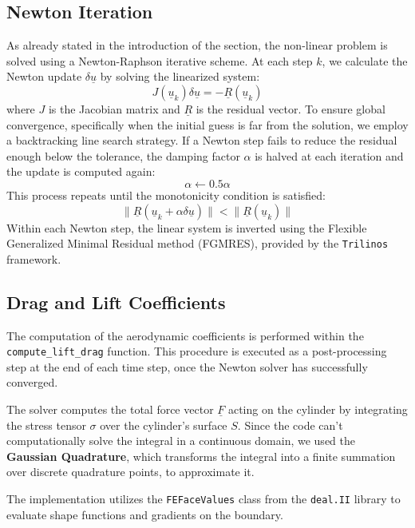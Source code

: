 \documentclass[11pt,a4paper]{article}
\renewcommand{\vec}[1]{\underline{#1}} %
\begin{document}
\subsection{Newton Iteration}
As already stated in the introduction of the section, the non-linear problem is solved using a Newton-Raphson iterative scheme. At each step $k$, we calculate the Newton update $\delta \vec{u}$ by solving the linearized system:
\begin{equation*}
    J(\vec{u}_k) \delta \vec{u} = -\vec{R}(\vec{u}_k)
\end{equation*}
where $J$ is the Jacobian matrix and $\vec{R}$ is the residual vector. To ensure global convergence, specifically when the initial guess is far from the solution, we employ a backtracking line search strategy. If a Newton step fails to reduce the residual enough below the tolerance, the damping factor $\alpha$ is halved at each iteration and the update is computed again:
\begin{equation*}
    \alpha \leftarrow 0.5\alpha
\end{equation*}
This process repeats until the monotonicity condition is satisfied:
\begin{equation*}
    \|\vec{R}(\vec{u}_k + \alpha \delta \vec{u})\| < \|\vec{R}(\vec{u}_k)\|
\end{equation*}
Within each Newton step, the linear system is inverted using the Flexible Generalized Minimal Residual method (FGMRES), provided by the \texttt{Trilinos} framework.

\subsection{Drag and Lift Coefficients}

The computation of the aerodynamic coefficients is performed within the \texttt{compute\_lift\_drag} function. This procedure is executed as a post-processing step at the end of each time step, once the Newton solver has successfully converged.

The solver computes the total force vector $\vec{F}$ acting on the cylinder by integrating the stress tensor $\sigma$ over the cylinder's surface $S$.
Since the code can't computationally solve the integral in a continuous domain, we used the \textbf{Gaussian Quadrature}, which transforms the integral into a finite summation over discrete quadrature points, to approximate it.

The implementation utilizes the \texttt{FEFaceValues} class from the \texttt{deal.II} library to evaluate shape functions and gradients on the boundary. 
\end{document}
